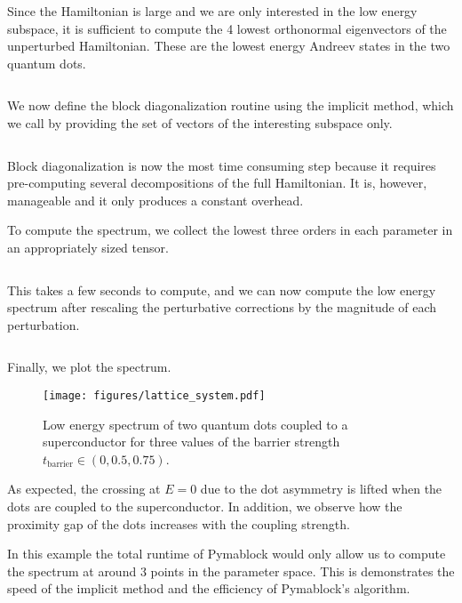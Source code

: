 Since the Hamiltonian is large and we are only interested in the low energy
subspace, it is sufficient to compute the 4 lowest orthonormal eigenvectors of
the unperturbed Hamiltonian.
These are the lowest energy Andreev states in the two quantum dots.
%
\inputminted[firstline=60, lastline=61]{ipython}{code_figures/lattice_system.py}
%
We now define the block diagonalization routine using the implicit method,
which we call by providing the set of vectors of the interesting subspace only.
%
\inputminted[firstline=63, lastline=63]{ipython}{code_figures/lattice_system.py}
%
Block diagonalization is now the most time consuming step because it requires
pre-computing several decompositions of the full Hamiltonian.
It is, however, manageable and it only produces a constant overhead.

To compute the spectrum, we collect the lowest three orders in each parameter
in an appropriately sized tensor.
%
\inputminted[firstline=65, lastline=68]{ipython}{code_figures/lattice_system.py}
%
This takes a few seconds to compute, and we can now compute the low energy
spectrum after rescaling the perturbative corrections by the magnitude of each
perturbation.
%
\inputminted[firstline=71, lastline=76]{ipython}{code_figures/lattice_system.py}
%
Finally, we plot the spectrum.
%
\begin{figure}[h!]
\centering
\texttt{[image: figures/lattice\_system.pdf]}
\caption{Low energy spectrum of two quantum dots coupled to a superconductor
for three values of the barrier strength $t_{\text{barrier}} \in (0, 0.5, 0.75)$.
}
\label{fig:QD_spectrum}
\end{figure}
%
As expected, the crossing at $E=0$ due to the dot asymmetry is lifted when the
dots are coupled to the superconductor.
In addition, we observe how the proximity gap of the dots increases with the
coupling strength.

In this example the total runtime of Pymablock would only allow us to compute
the spectrum at around 3 points in the parameter space.
This is demonstrates the speed of the implicit method and the efficiency of
Pymablock's algorithm.
